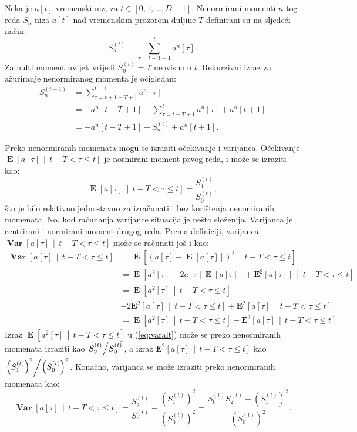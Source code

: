 \documentclass[lmodern, utf8, diplomski, numeric]{fer}
\newcommand{\E}[1]{\operatorname{\mathbf{E}}\q[#1\w]}
\newcommand{\Esq}[1]{\operatorname{\mathbf{E}^2}\q[#1\w]}
\newcommand{\Efromto}[2]{\operatorname{\mathbf{E}}\q[#1\, \middle\vert\, #2\w]}
\newcommand{\Esqfromto}[2]{\operatorname{\mathbf{E}^2}\q[#1\, \middle\vert\, #2\w]}
\newcommand{\Varfromto}[2]{\operatorname{\mathbf{Var}}\q[#1\, \middle\vert\, #2\w]}
\newcommand{\q}{\left}
\newcommand{\w}{\right}
\begin{document}
  Neka je $a\q[t\w]$ vremenski niz, za $t \in \q[0, 1, \ldots, D - 1\w]$.
  Nenormirani momenti $n$-tog reda $S_n$ niza $a\q[t\w]$ nad vremenskim prozorom duljine $T$ definirani su na sljedeći način:
  \begin{equation}
  \label{eq:nonnorm}
  S_n^{(t)} = \sum_{\tau=t-T+1}^{t} a^n\q[\tau\w].
  \end{equation}
  Za nulti moment uvijek vrijedi $S_0^{(t)} = T$ neovisno o $t$.
  Rekurzivni izraz za ažuriranje nenormiranog momenta je očigledan:
  \begin{align}
  S_n^{(t+1)} &= \sum_{\tau=t+1-T+1}^{t+1} a^n\q[\tau\w] \nonumber \\
    &= -a^n\q[t-T+1\w] + \sum_{\tau=t-T+1}^{t} a^n\q[\tau\w] + a^n\q[t+1\w] \nonumber \\
    \label{eq:rec}
    &= -a^n\q[t-T+1\w] + S_n^{(t)} + a^n\q[t+1\w].
  \end{align}
  
  Preko nenormiranih momenata mogu se izraziti očekivanje i varijanca.
  Očekivanje $\Efromto{a\q[\tau\w]}{t - T < \tau \le t}$ je normirani moment prvog reda, i može se izraziti kao:
  \begin{equation}
  \label{eq:recmean}
  \Efromto{a\q[\tau\w]}{t - T < \tau \le t} = \frac{S_1^{(t)}}{S_0^{(t)}},
  \end{equation}
  što je bilo relativno jednostavno za izračunati i bez korištenja nenomiranih momenata.
  No, kod računanja varijance situacija je nešto složenija.
  Varijanca je centrirani i normirani moment drugog reda.
  Prema definiciji, varijanca $\Varfromto{a\q[\tau\w]}{t - T < \tau \le t}$ može se računati još i kao:
  \begin{align}
    \Varfromto{a\q[\tau\w]}{t - T < \tau \le t} &= \Efromto{\q(a\q[\tau\w] - \E{a\q[\tau\w]} \w)^2}{t - T < \tau \le t} \nonumber \\
    &= \Efromto{a^2\q[\tau\w] - 2 a\q[\tau\w] \E{a\q[\tau\w]} + \Esq{a\q[\tau\w]}}{t - T < \tau \le t} \nonumber \\
    &= \Efromto{a^2\q[\tau\w]}{t - T < \tau \le t} \nonumber \\
    & - 2\Esqfromto{a\q[\tau\w]}{t - T < \tau \le t} + \Esqfromto{a\q[\tau\w]}{t - T < \tau \le t} \nonumber \\
    \label{eq:varalt}
    &= \Efromto{a^2\q[\tau\w]}{t - T < \tau \le t} - \Esqfromto{a\q[\tau\w]}{t - T < \tau \le t}
  \end{align}
  Izraz $\Efromto{a^2\q[\tau\w]}{t - T < \tau \le t}$ u (\ref{eq:varalt}) može se preko nenormiranih momenata izraziti kao $\q. S_2^{(t)} \middle/ S_0^{(t)} \w.$,
  a izraz $\Esqfromto{a\q[\tau\w]}{t - T < \tau \le t}$ kao $\q. \q(S_1^{(t)}\w)^2 \middle/ \q(S_0^{(t)}\w)^2 \w.$.
  Konačno, varijanca se može izraziti preko nenormiranih momenata kao:
  \begin{equation}
    \label{eq:recvar}
    \Varfromto{a\q[\tau\w]}{t - T < \tau \le t} = \frac{S_2^{(t)}}{S_0^{(t)}} - \frac{\q(S_1^{(t)}\w)^2}{\q(S_0^{(t)}\w)^2}
    = \frac{S_0^{(t)} S_2^{(t)} - \q(S_1^{(t)}\w)^2}{\q(S_0^{(t)}\w)^2}.
  \end{equation}
  
\end{document}
